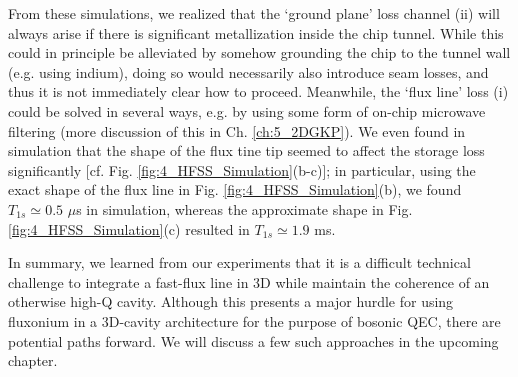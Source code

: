 From these simulations, we realized that the `ground plane' loss channel (ii) will always arise if there is significant metallization inside the chip tunnel. While this could in principle be alleviated by somehow grounding the chip to the tunnel wall (e.g. using indium), doing so would necessarily also introduce seam losses, and thus it is not immediately clear how to proceed. Meanwhile, the `flux line' loss (i) could be solved in several ways, e.g. by using some form of on-chip microwave filtering \cite{pozar2012microwave} (more discussion of this in Ch. \ref{ch:5_2DGKP}). We even found in simulation that the shape of the flux tine tip seemed to affect the storage loss significantly [cf. Fig. \ref{fig:4_HFSS_Simulation}(b-c)]; in particular, using the exact shape of the flux line in Fig. \ref{fig:4_HFSS_Simulation}(b), we found $T_{1s} \simeq 0.5$ $\mu$s in simulation, whereas the approximate shape in Fig. \ref{fig:4_HFSS_Simulation}(c) resulted in $T_{1s} \simeq 1.9$ ms. 

In summary, we learned from our experiments that it is a difficult technical challenge to integrate a fast-flux line in 3D while maintain the coherence of an otherwise high-Q cavity. Although this presents a major hurdle for using fluxonium in a 3D-cavity architecture for the purpose of bosonic QEC, there are potential paths forward. We will discuss a few such approaches in the upcoming chapter. 

\printbibliography[heading=subbibliography, title = References]